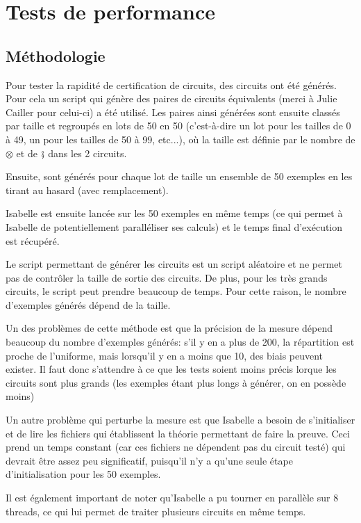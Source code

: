 \documentclass[12pt, a4paper]{article}
\begin{document}
\section{Tests de performance}

\subsection{Méthodologie}

Pour tester la rapidité de certification de circuits, des circuits ont été générés. Pour cela un script qui génère des paires de circuits équivalents (merci à Julie Cailler pour celui-ci) a été utilisé. Les paires ainsi générées sont ensuite classés par taille et regroupés en lots de 50 en 50 (c'est-à-dire un lot pour les tailles de 0 à 49, un pour les tailles de 50 à 99, etc...), où la taille est définie par le nombre de $\otimes$ et de $\fatsemi$ dans les 2 circuits.

Ensuite, sont générés pour chaque lot de taille un ensemble de 50 exemples en les tirant au hasard (avec remplacement).

Isabelle est ensuite lancée sur les 50 exemples en même temps (ce qui permet à Isabelle de potentiellement paralléliser ses calculs) et le temps final d'exécution est récupéré.

Le script permettant de générer les circuits est un script aléatoire et ne permet pas de contrôler la taille de sortie des circuits. De plus, pour les très grands circuits, le script peut prendre beaucoup de temps. Pour cette raison, le nombre d'exemples générés dépend de la taille.

Un des problèmes de cette méthode est que la précision de la mesure dépend beaucoup du nombre d'exemples générés: s'il y en a plus de 200, la répartition est proche de l'uniforme, mais lorsqu'il y en a moins que 10, des biais peuvent exister. Il faut donc s'attendre à ce que les tests soient moins précis lorque les circuits sont plus grands (les exemples étant plus longs à générer, on en possède moins)

Un autre problème qui perturbe la mesure est que Isabelle a besoin de s'initialiser et de lire les fichiers qui établissent la théorie permettant de faire la preuve. Ceci prend un temps constant (car ces fichiers ne dépendent pas du circuit testé) qui devrait être assez peu significatif, puisqu'il n'y a qu'une seule étape d'initialisation pour les 50 exemples.

Il est également important de noter qu'Isabelle a pu tourner en parallèle sur 8 threads, ce qui lui permet de traiter plusieurs circuits en même temps.
\end{document}
